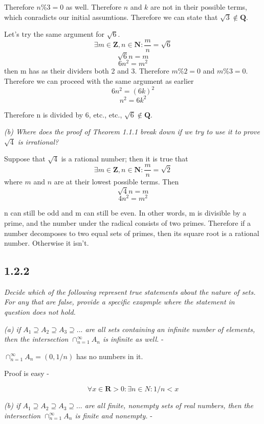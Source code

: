 \documentclass[11pt,oneside,titlepage]{book}
\begin{document}
Therefore $n\%3 = 0$ as well. Therefore $n$ and $k$ are not in their possible
terms, which conradicts our initial assumtions. Therefore we can state that
$\sqrt{3} \notin \textbf{Q}$.

Let's try the same argument for $\sqrt{6}$.
$$\exists m \in \textbf{Z}, n \in \textbf{N}: \frac{m}{n} = \sqrt{6}$$
$$\sqrt{6}n = m$$
$$6n^2 = m^2$$
then m has as their dividers both 2 and 3. Therefore $m\%2 = 0$ and $m\%3 = 0$.
Therefore we can proceed with the same argument as earlier
$$6n^2 = (6k)^2$$
$$n^2 = 6k^2$$

Therefore n is divided by 6, etc., etc., $\sqrt{6} \notin \textbf{Q}$.

\textit{(b) Where does the proof of Theorem 1.1.1 break down if we try to use
  it to prove $\sqrt{4}$ is irrational? }

Suppose that $\sqrt{4}$ is a rational number; then it is true that
$$\exists m \in \textbf{Z}, n \in \textbf{N}: \frac{m}{n} = \sqrt{2}$$
where $m$ and $n$ are at their lowest possible terms. Then
$$\sqrt{4}n = m$$
$$4n^2 = m^2$$

n can still be odd and m can still be even. In other words, m is divisible by
a prime, and the number under the radical consists of two primes. Therefore
if a number decomposes to two equal sets of primes, then its square root is
a rational number. Otherwise it isn't.

\subsection*{1.2.2}

\textit{Decide which of the following represent true statements about the
  nature of sets. For any that are false, provide a specific exapmple where the
  statement in question does not hold.}

\textit{(a) if $A_1 \supseteq A_2 \supseteq A_3 \supseteq ... $ are all sets
  containing an infinite number of elements, then the intersection
  $\cap_{n = 1}^{\infty} A_n$ is infinite as well.} -

$\cap_{n = 1}^{\infty} A_n = (0, 1/n)$ has no numbers in it.

Proof is easy -

$$\forall x \in \textbf{R} > 0: \exists n \in N: 1/n < x$$

\textit{(b) if $A_1 \supseteq A_2 \supseteq A_3 \supseteq ... $ are all finite,
  nonempty sets of real numbers, then the intersection
  $\cap_{n = 1}^{\infty} A_n$ is finite and nonempty.} -
\end{document}
